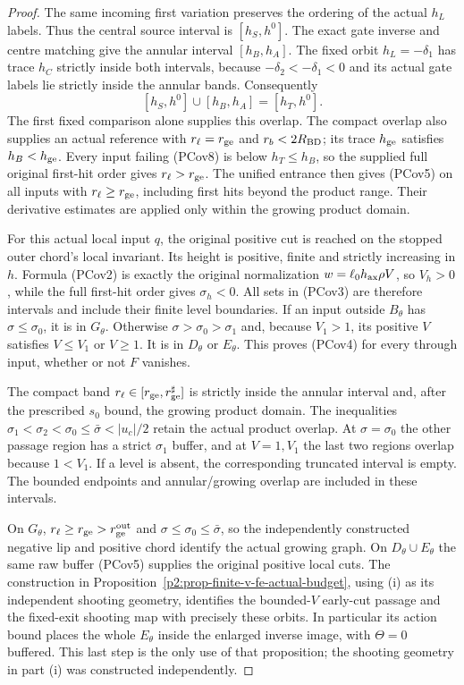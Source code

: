 \begin{proof}
The same incoming first variation preserves the ordering of the
actual $h_L$ labels. Thus the central source interval is $[h_S,h^0]$.
The exact gate inverse and centre matching give the annular interval
$[h_B,h_A]$. The fixed orbit $h_L=-\delta_1$ has trace $h_C$ strictly
inside both intervals, because $-\delta_2<-\delta_1<0$ and its actual
gate labels lie strictly inside the annular bands. Consequently
\[
 [h_S,h^0]\cup[h_B,h_A]=[h_T,h^0].                       \tag{PCov8}
\]
The first fixed comparison alone supplies this overlap. The compact overlap also supplies an actual reference with $r_\ell=r_{\rm ge}$ and $r_b<2R_{\rm BD}$;
its trace $h_{\rm ge}$ satisfies $h_B<h_{\rm ge}$.
Every input failing (PCov8) is below $h_T\le h_B$, so the supplied full
original first-hit order gives $r_\ell>r_{\rm ge}$. The unified entrance
then gives (PCov5) on all inputs with $r_\ell\ge r_{\rm ge}$, including
first hits beyond the product range. Their derivative estimates are applied only within the growing product
domain.

For this actual local input $q$, the original positive cut is reached
on the stopped outer chord's local invariant. Its height is positive,
finite and strictly increasing in $h$. Formula (PCov2) is exactly the
original normalization $w=\ell_0h_{\rm ax}\rho V$, so
$V_h>0$, while the full first-hit order gives $\sigma_h<0$.
All sets in (PCov3) are therefore intervals and include their finite
level boundaries. If an input outside $B_\theta$ has
$\sigma\le\sigma_0$, it is in $G_\theta$. Otherwise
$\sigma>\sigma_0>\sigma_1$ and, because $V_1>1$, its positive $V$
satisfies $V\le V_1$ or $V\ge1$. It is in $D_\theta$ or
$E_\theta$. This proves (PCov4) for every through input, whether or not $F$ vanishes.

The compact band $r_\ell\in[r_{\rm ge},r_{\rm ge}^{\sharp}]$
is strictly inside the annular interval and, after the prescribed
$s_0$ bound, the growing product domain. The inequalities
$\sigma_1<\sigma_2<\sigma_0\le\bar\sigma<|u_c|/2$ retain the actual
product overlap. At $\sigma=\sigma_0$ the other passage region has a strict
$\sigma_1$ buffer, and at $V=1,V_1$ the last two regions overlap
because $1<V_1$. If a level is absent, the corresponding truncated interval is empty. The bounded endpoints and annular/growing overlap are included in these
intervals.

On $G_\theta$, $r_\ell\ge r_{\rm ge}>r_{\rm ge}^{\rm out}$ and
$\sigma\le\sigma_0\le\bar\sigma$, so the independently constructed
negative lip and positive chord identify the actual growing graph.
On $D_\theta\cup E_\theta$ the same raw buffer (PCov5) supplies the
original positive local cuts. The construction in Proposition~\ref{p2:prop-finite-v-fe-actual-budget}, using (i) as its
independent shooting geometry, identifies the bounded-$V$ early-cut
passage and the fixed-exit shooting map with precisely these orbits. In particular its action bound places the whole $E_\theta$
inside the enlarged inverse image, with $\Theta=0$ buffered. This last step is the only use of that proposition; the shooting
geometry in part (i) was constructed independently.


\end{proof}
